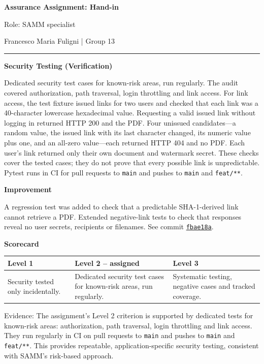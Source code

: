 \documentclass[10pt,a4paper]{article}
\newcommand{\sectionheading}[1]{\par\vspace{0.8em}{\large\bfseries #1}\par\nobreak}
\newcommand{\subheading}[1]{\par\vspace{0.25em}\textbf{#1}\par\nobreak}
\begin{document}
\pagestyle{empty}
\begin{center}
    {\Large\bfseries Assurance Assignment: Hand-in}\par
    Role: SAMM specialist\par
    Francesco Maria Fuligni \quad | \quad Group 13
\end{center}
\vspace{-0.2em}\hrule

\sectionheading{1. Core}
\subheading{Security Testing (Verification)}
Dedicated security test cases for known-risk areas, run regularly.
The audit covered authorization, path traversal, login throttling and link access. 
For link access, the test fixture issued links for two users and checked that each link was a 
40-character lowercase hexadecimal value. Requesting a valid issued link without logging in returned 
HTTP 200 and the PDF. Four unissued candidates—a random value, the issued link with its last character 
changed, its numeric value plus one, and an all-zero value—each returned HTTP 404 and no PDF. 
Each user's link returned only their own document and watermark secret. These checks cover the 
tested cases; they do not prove that every possible link is unpredictable.
Pytest runs in CI for pull requests to \texttt{main} and pushes to \texttt{main} and \texttt{feat/**}.

\subheading{Improvement}
A regression test was added to check that a predictable SHA-1-derived link cannot retrieve
a PDF. Extended negative-link tests to check that responses reveal no user secrets,
recipients or filenames. See commit
\href{https://github.com/chirichexe/tatou-2026/commit/fbae18a9970c721a8809d2ff2d43ef10be03d7fc}{\texttt{fbae18a}}.

\subheading{Scorecard}
\par\begin{tabularx}{\linewidth}{@{}LHL@{}}
\toprule
\textbf{Level 1} & \textbf{Level 2 -- assigned} & \textbf{Level 3} \\
\midrule
Security tested only incidentally. & Dedicated security test cases for known-risk areas, run regularly. & Systematic testing, negative cases and tracked coverage. \\
\bottomrule
\end{tabularx}\par
Evidence: The assignment's Level 2 criterion is supported by dedicated tests
for known-risk areas: authorization, path traversal, login throttling and link
access. They run regularly in CI on pull requests to \texttt{main} and pushes
to \texttt{main} and \texttt{feat/**}. This provides repeatable, application-specific
security testing, consistent with SAMM's risk-based approach.
\end{document}
